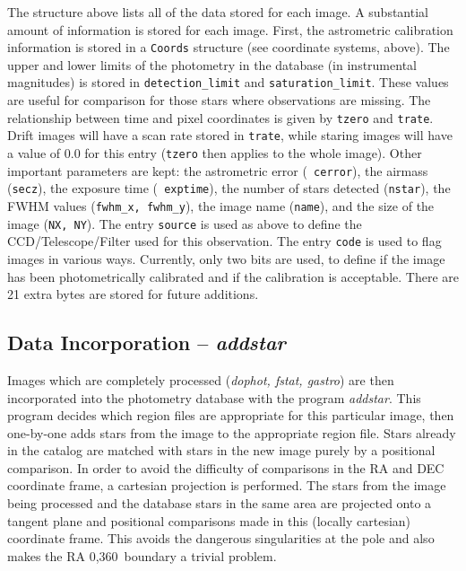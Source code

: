 \documentclass{article}
\newcommand\pr{\em}                   %
\begin{document}
The structure above lists all of the data stored for each image.  A
substantial amount of information is stored for each image.  First,
the astrometric calibration information is stored in a {\tt Coords}
structure (see coordinate systems, above).  The upper and lower limits
of the photometry in the database (in instrumental magnitudes) is
stored in {\tt detection\_limit} and {\tt saturation\_limit}.  These
values are useful for comparison for those stars where observations
are missing.  The relationship between time and pixel coordinates is
given by {\tt tzero} and {\tt trate}.  Drift images will have a scan
rate stored in {\tt trate}, while staring images will have a value of
0.0 for this entry ({\tt tzero} then applies to the whole image).
Other important parameters are kept: the astrometric error ({\tt
  cerror}), the airmass ({\tt secz}), the exposure time ({\tt
  exptime}), the number of stars detected ({\tt nstar}), the FWHM
values ({\tt fwhm\_x, fwhm\_y}), the image name ({\tt name}), and the
size of the image ({\tt NX, NY}).  The entry {\tt source} is used as
above to define the CCD/Telescope/Filter used for this observation.
The entry {\tt code} is used to flag images in various ways.
Currently, only two bits are used, to define if the image has been
photometrically calibrated and if the calibration is acceptable.
There are 21 extra bytes are stored for future additions.

\subsection{Data Incorporation -- {\pr addstar}}

Images which are completely processed ({\pr dophot, fstat, gastro}) are
then incorporated into the photometry database with the program {\pr 
addstar}.  This program decides which region files are appropriate
for this particular image, then one-by-one adds stars from the image
to the appropriate region file.  Stars already in the catalog are
matched with stars in the new image purely by a positional comparison.
In order to avoid the difficulty of comparisons in the RA and DEC
coordinate frame, a cartesian projection is performed.  The stars from
the image being processed and the database stars in the same area are
projected onto a tangent plane and positional comparisons made in this
(locally cartesian) coordinate frame.  This avoids the dangerous
singularities at the pole and also makes the RA 0,360\degree\ boundary
a trivial problem.  
\end{document}
